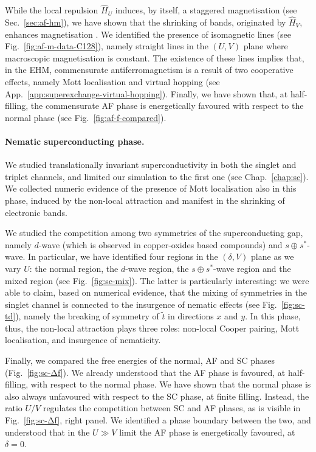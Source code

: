 While the local repulsion $\hat H_U$ induces, by itself, a staggered magnetisation (see Sec.~\ref{sec:af-hm}), we have shown that the shrinking of bands, originated by $\hat H_V$, enhances magnetisation . We identified the presence of isomagnetic lines (see Fig.~\ref{fig:af-m-data-C128}), namely straight lines in the $(U,V)$ plane where macroscopic magnetisation is constant. The existence of these lines implies that, in the EHM, commensurate antiferromagnetism is a result of two cooperative effects, namely Mott localisation and virtual hopping (see App.~\ref{app:superexchange-virtual-hopping}). Finally, we have shown that, at half-filling, the commensurate AF phase is energetically favoured with respect to the normal phase (see Fig.~\ref{fig:af-f-compared}).

\paragraph{Nematic superconducting phase.}

We studied translationally invariant superconductivity in both the singlet and triplet channels, and limited our simulation to the first one (see Chap.~\ref{chap:sc}). We collected numeric evidence of the presence of Mott localisation also in this phase, induced by the non-local attraction and manifest in the shrinking of electronic bands.

We studied the competition among two symmetries of the superconducting gap, namely $d$-wave (which is observed in copper-oxides based compounds) and $s \oplus s^*$-wave. In particular, we have identified four regions in the $(\delta,V)$ plane as we vary $U$: the normal region, the $d$-wave region, the $s \oplus s^*$-wave region and the mixed region (see Fig.~\ref{fig:sc-mix}). The latter is particularly interesting: we were able to claim, based on numerical evidence, that the mixing of symmetries in the singlet channel is connected to the insurgence of nematic effects (see Fig.~\ref{fig:sc-td}), namely the breaking of symmetry of $\tilde{t}$ in directions $x$ and $y$. In this phase, thus, the non-local attraction plays three roles: non-local Cooper pairing, Mott localisation, and insurgence of nematicity. 

Finally, we compared the free energies of the normal, AF and SC phases (Fig.~\ref{fig:sc-Δf}). We already understood that the AF phase is favoured, at half-filling, with respect to the normal phase. We have shown that the normal phase is also always unfavoured with respect to the SC phase, at finite filling. Instead, the ratio $U/V$ regulates the competition between SC and AF phases, as is visible in Fig.~\ref{fig:sc-Δf}, right panel. We identified a phase boundary between the two, and understood that in the $U \gg V$ limit the AF phase is energetically favoured, at $\delta=0$.

